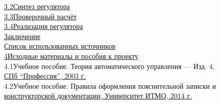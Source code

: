 \documentclass[fleqn, a4paper, 12pt, russian]{article}
\begin{document}
	{\fontsize{14pt}{0cm}\selectfont \underline{\hspace{0.8cm}3.2\hspace{0.36cm}Синтез регулятора\hspace{11.07cm}}} \\ \vspace{0.2cm}
	{\fontsize{14pt}{0cm}\selectfont \underline{\hspace{0.8cm}3.3\hspace{0.36cm}Проверочный расчёт\hspace{10.65cm}}} \\ \vspace{0.2cm}
	{\fontsize{14pt}{0cm}\selectfont \underline{\hspace{0.8cm}3.4\hspace{0.36cm}Реализация регулятора\hspace{10.07cm}}} \\ \vspace{0.2cm}
	{\fontsize{14pt}{0cm}\selectfont \underline{\hspace{1.8cm}Заключение \hspace{12.38cm}}} \\ \vspace{0.2cm}
	{\fontsize{14pt}{0cm}\selectfont \underline{\hspace{1.8cm}Список использованных источников \hspace{7.05cm}}} \\ \vspace{0.2cm}
	{\fontsize{14pt}{0cm}\selectfont \underline{4\hspace{0.5cm}Исходные материалы и пособия к проекту \hspace{6.7cm}}} \\ \vspace{0.2cm}
	{\fontsize{14pt}{0cm}\selectfont \hspace{0.8cm}4.1\hspace{0.36cm}Учебное пособие. Теория автоматического управления --- Изд. 4,\\ \underline{\hspace{1.8cm}СПб \enquote{Профессия}, 2003 г. \hspace{9.2cm}}} \\ \vspace{0.2cm}
	{\fontsize{14pt}{0cm}\selectfont \hspace{0.8cm}4.2\hspace{0.36cm}Учебное пособие. Правила оформления пояснительной записки и\\ \underline{\hspace{1.8cm}конструкторской документации, Университет ИТМО, 2014 г. \hspace{1.5cm}}} \\ \vspace{0.2cm}
\end{document}
